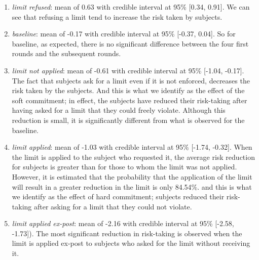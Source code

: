 \documentclass[
]{book}
\providecommand{\tightlist}{%
  \setlength{\itemsep}{0pt}\setlength{\parskip}{0pt}}
\begin{document}
\begin{enumerate}
\def\labelenumi{\arabic{enumi}.}
\tightlist
\item
  \emph{limit refused}: mean of 0.63
  with credible interval at 95\% {[}0.34, 0.91{]}.
  We can see that refusing a limit tend to increase the risk taken by subjects.
\item
  \emph{baseline}: mean of -0.17
  with credible interval at 95\% {[}-0.37, 0.04{]}.
  So for baseline, as expected, there is no significant difference between the
  four first rounds and the subsequent rounds.
\item
  \emph{limit not applied}: mean of -0.61
  with credible interval at 95\% {[}-1.04, -0.17{]}.
  The fact that subjects ask for a limit even if it is not enforced, decreases the
  risk taken by the subjects.
  And this is what we identify as the effect of the soft commitment; in effect,
  the subjects have reduced their risk-taking after having asked for a limit that
  they could freely violate.
  Although this reduction is small, it is significantly different from what is
  observed for the baseline.
\item
  \emph{limit applied}: mean of -1.03
  with credible interval at 95\% {[}-1.74, -0.32{]}.
  When the limit is applied to the subject who requested it, the average risk
  reduction for subjects is greater than for those to whom the limit was not
  applied.
  However, it is estimated that the probability that the application of the limit
  will result in a greater reduction in the limit is only
  84.54\%.
  and this is what we identify as the effect of hard commitment; subjects reduced
  their risk-taking after asking for a limit that they could not violate.
\item
  \emph{limit applied ex-post}: mean of -2.16
  with credible interval at 95\% {[}-2.58, -1.73{]}).
  The most significant reduction in risk-taking is observed when the limit is
  applied ex-post to subjects who asked for the limit without receiving it.
\end{enumerate}
\end{document}
